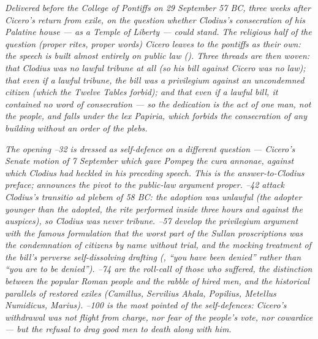 
\textit{Delivered before the College of Pontiffs on 29
September 57 BC, three weeks after Cicero's return from
exile, on the question whether Clodius's consecration of his
Palatine house --- as a Temple of Liberty --- could stand. The
\textit{religious} half of the question (proper rites,
proper words) Cicero leaves to the pontiffs as their own:
the speech is built almost entirely on \textit{public law}
(). Three threads are then woven: that
Clodius was no lawful tribune at all (so his bill against
Cicero was no law); that even if a lawful tribune, the bill
was a privilegium against an uncondemned citizen (which the
Twelve Tables forbid); and that even if a lawful bill, it
contained no word of consecration --- so the dedication is
the act of one man, not the people, and falls under the
\textit{lex Papiria}, which forbids the consecration of any
building without an order of the plebs.}

\textit{The opening --32 is dressed as
self-defence on a different question --- Cicero's Senate
motion of 7 September which gave Pompey the
\textit{cura annonae}, against which Clodius had heckled in
his preceding speech. This is the answer-to-Clodius preface;
 announces the pivot to the public-law
argument proper. --42 attack Clodius's
\textit{transitio ad plebem} of 58 BC: the adoption was
unlawful (the adopter younger than the adopted, the rite
performed inside three hours and against the auspices), so
Clodius was never tribune. --57 develop the
\textit{privilegium} argument with the famous formulation
that the worst part of the Sullan proscriptions was the
condemnation of citizens by name without trial, and the
mocking treatment of the bill's perverse self-dissolving
drafting (, ``you have been denied'' rather
than ``you are to be denied''). --74 are the
roll-call of those who suffered, the distinction between
the popular Roman people and the rabble of hired men, and
the historical parallels of restored exiles
(Camillus, Servilius Ahala, Popilius, Metellus Numidicus,
Marius). --100 is the most pointed of the
self-defences: Cicero's withdrawal was not flight from
charge, nor fear of the people's vote, nor cowardice ---
but the refusal to drag good men to death along with him.}

